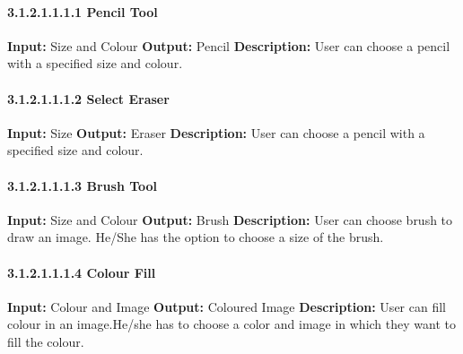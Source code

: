 \documentclass{scrreprt}
\begin{document}
\paragraph{3.1.2.1.1.1.1 Pencil Tool}
\hfill \vspace{2.5mm} \break 
\textbf{Input:} Size and Colour \newline
\textbf{Output:} Pencil
\vspace{1mm}\newline
\textbf{Description:} \newline 
User can choose a pencil with a specified size and colour.

\paragraph{3.1.2.1.1.1.2 Select Eraser}
\hfill \vspace{2.5mm} \break 
\textbf{Input:} Size \newline
\textbf{Output:} Eraser
\vspace{1mm}\newline
\textbf{Description:} \newline 
User can choose a pencil with a specified size and colour.

\paragraph{3.1.2.1.1.1.3 Brush Tool}
\hfill \vspace{2.5mm} \break 
\textbf{Input:} Size and Colour \newline
\textbf{Output:} Brush
\vspace{1mm}\newline
\textbf{Description:} \newline 
User can choose brush to draw an image. He/She has the option to choose a size of the brush.

\paragraph{3.1.2.1.1.1.4 Colour Fill}
\hfill \vspace{2.5mm} \break 
\textbf{Input:} Colour and Image \newline
\textbf{Output:} Coloured Image
\vspace{1mm}\newline
\textbf{Description:} \newline 
User can fill colour in an image.He/she has to choose a color and image in which they want to fill the colour.
\end{document}
